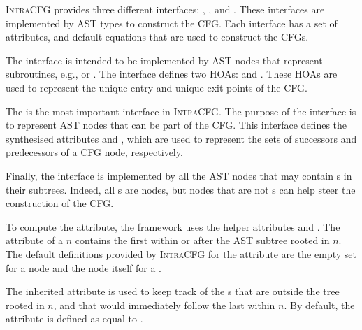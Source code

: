 \textsc{IntraCFG} provides three different interfaces:
, , and .
These interfaces are implemented by AST types to construct the CFG.
Each interface has a set of attributes, and default equations that are used to
construct the CFGs.

The  interface is intended to be implemented by AST nodes that represent
subroutines, e.g.,  or .
The  interface defines two HOAs:  and
. These HOAs are used to represent the unique entry and unique exit points
of the CFG.

The  is the most important interface in \textsc{IntraCFG}.
The purpose of the  interface is to represent AST nodes that can
be part of the CFG. This interface defines the synthesised
attributes  and , which are used to
represent the sets of successors and predecessors of a CFG node, respectively.


Finally, the  interface is implemented by all the AST nodes that may
contain s in their subtrees. Indeed, all s are 
nodes, but  nodes that are not s can
help steer the construction of the CFG.

To compute the  attribute, the framework uses the helper
attributes  and . The
 attribute of a  $n$
contains the first  within or after
the AST subtree rooted in $n$.
The default definitions provided by \textsc{IntraCFG} for the 
attribute are the empty set for a  node and the node itself
for a .

The inherited attribute  is used to keep track of the
s that are outside the tree rooted in $n$, and that would immediately follow the
last  within $n$.
By default, the  attribute is defined as equal to .

